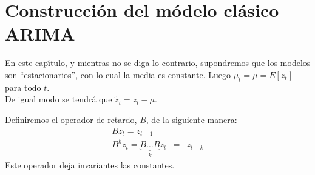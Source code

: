 %
%

\chapter{Construcci\'on del m\'odelo cl\'asico ARIMA}

En este cap\'{\i}tulo, y mientras no se diga lo contrario, supondremos que los
modelos son ``estacionarios'', con lo cual la media es constante.
Luego $\mu_t=\mu = E[z_t]$ para todo $t$.\\

De igual modo se tendr\'a que $\widetilde{z}_t = z_t -\mu$.

\begin{definicion}\label{def:operadorderetardo}
Definiremos el operador de retardo, $B$, de la siguiente manera:
\begin{eqnarray*}
Bz_t=z_{t-1}\\
B^k z_t=\underbrace{B\dots B}_kz_t&=&z_{t-k}
\end{eqnarray*}
Este operador deja invariantes las constantes.
\end{definicion}
\newpage 
%
%



%
%



%
%



%
\newpage
%

%
%



%
%


